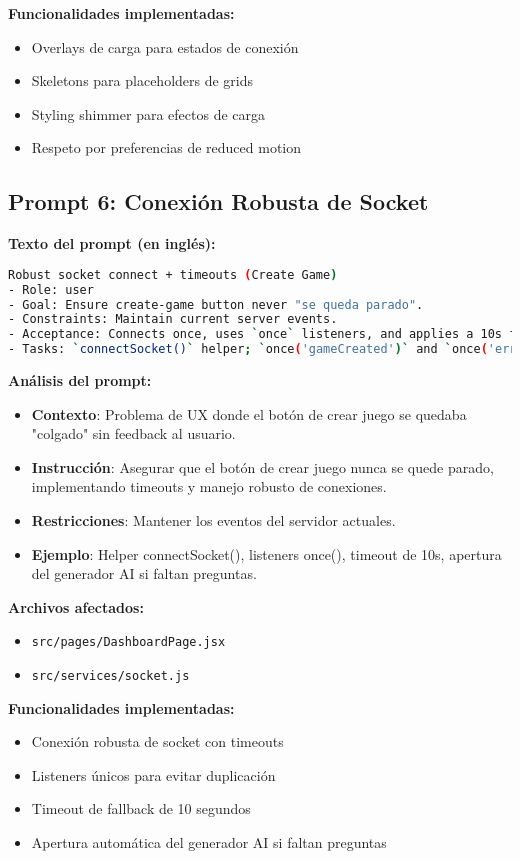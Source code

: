 \documentclass[12pt,a4paper]{article}
\begin{document}
\textbf{Funcionalidades implementadas:}
\begin{itemize}
    \item Overlays de carga para estados de conexión
    \item Skeletons para placeholders de grids
    \item Styling shimmer para efectos de carga
    \item Respeto por preferencias de reduced motion
\end{itemize}

\subsection{Prompt 6: Conexión Robusta de Socket}

\textbf{Texto del prompt (en inglés):}
\begin{lstlisting}[language=bash]
Robust socket connect + timeouts (Create Game)
- Role: user
- Goal: Ensure create-game button never "se queda parado".
- Constraints: Maintain current server events.
- Acceptance: Connects once, uses `once` listeners, and applies a 10s fallback timeout; opens AI generator if missing questions.
- Tasks: `connectSocket()` helper; `once('gameCreated')` and `once('error')`; timeout clearing.
\end{lstlisting}

\textbf{Análisis del prompt:}
\begin{itemize}
    \item \textbf{Contexto}: Problema de UX donde el botón de crear juego se quedaba "colgado" sin feedback al usuario.
    \item \textbf{Instrucción}: Asegurar que el botón de crear juego nunca se quede parado, implementando timeouts y manejo robusto de conexiones.
    \item \textbf{Restricciones}: Mantener los eventos del servidor actuales.
    \item \textbf{Ejemplo}: Helper connectSocket(), listeners once(), timeout de 10s, apertura del generador AI si faltan preguntas.
\end{itemize}

\textbf{Archivos afectados:}
\begin{itemize}
    \item \texttt{src/pages/DashboardPage.jsx}
    \item \texttt{src/services/socket.js}
\end{itemize}

\textbf{Funcionalidades implementadas:}
\begin{itemize}
    \item Conexión robusta de socket con timeouts
    \item Listeners únicos para evitar duplicación
    \item Timeout de fallback de 10 segundos
    \item Apertura automática del generador AI si faltan preguntas
\end{itemize}
\end{document}
